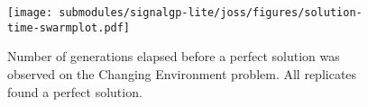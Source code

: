 \begin{figure}[h]

\centering
\texttt{[image: submodules/signalgp-lite/joss/figures/solution-time-swarmplot.pdf]}

\caption{%
Number of generations elapsed before a perfect solution was observed on the Changing Environment problem.
All replicates found a perfect solution.
} \label{fig:tts-changing}

\end{figure}
